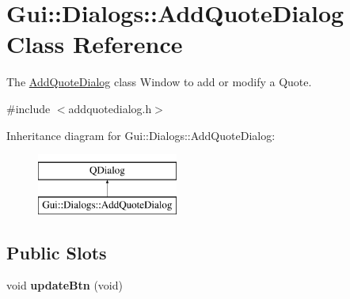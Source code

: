 \hypertarget{classGui_1_1Dialogs_1_1AddQuoteDialog}{\section{Gui\-:\-:Dialogs\-:\-:Add\-Quote\-Dialog Class Reference}
\label{classGui_1_1Dialogs_1_1AddQuoteDialog}
}


The \hyperlink{classGui_1_1Dialogs_1_1AddQuoteDialog}{Add\-Quote\-Dialog} class Window to add or modify a Quote.  




{\ttfamily \#include $<$addquotedialog.\-h$>$}

Inheritance diagram for Gui\-:\-:Dialogs\-:\-:Add\-Quote\-Dialog\-:\begin{figure}[H]
\begin{center}
\leavevmode
\includegraphics[height=2.000000cm]{d6/d43/classGui_1_1Dialogs_1_1AddQuoteDialog}
\end{center}
\end{figure}
\subsection*{Public Slots}
\begin{DoxyCompactItemize}
\item 
\hypertarget{classGui_1_1Dialogs_1_1AddQuoteDialog_a5fa7b833c2a4271cc637e7dd9ec72fff}{void {\bfseries update\-Btn} (void)}\label{classGui_1_1Dialogs_1_1AddQuoteDialog_a5fa7b833c2a4271cc637e7dd9ec72fff}

\end{DoxyCompactItemize}
